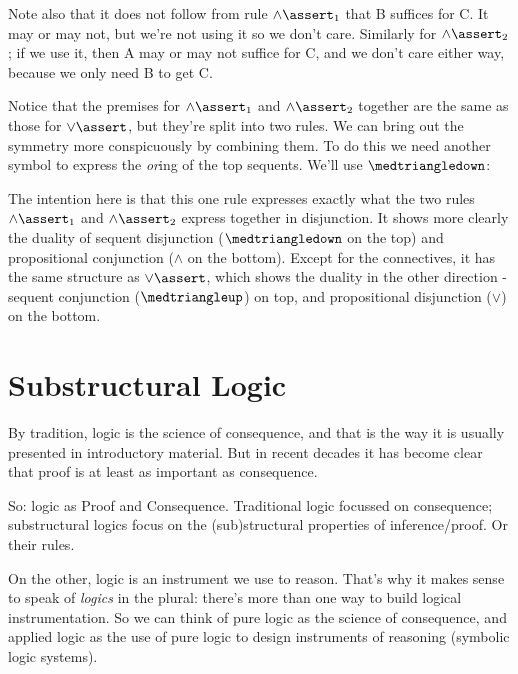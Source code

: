 \documentclass{article}
\begin{document}
Note also that it does not follow from rule \(\land\linfer_1\) that B
suffices for C. It may or may not, but we're not using it so we don't
care. Similarly for \(\land\linfer_2\); if we use it, then A may or may
not suffice for C, and we don't care either way, because we only need
B to get C.

Notice that the premises for \(\land\linfer_1\) and \(\land\linfer_2\)
together are the same as those for \(\lor\linfer\), but they're split
into two rules. We can bring out the symmetry more conspicuously by
combining them. To do this we need another symbol to express the
\textit{or}ing of the top sequents. We'll use \(\medtriangledown\):


The intention here is that this one rule expresses exactly what the
two rules \(\land\linfer_1\) and \(\land\linfer_2\) express together in
disjunction. It shows more clearly the duality of sequent disjunction
(\(\medtriangledown\) on the top) and propositional conjunction
(\(\land\) on the bottom). Except for the connectives, it has the same
structure as \(\lor\linfer\), which shows the duality in the other
direction - sequent conjunction (\(\medtriangleup\)) on top, and
propositional disjunction (\(\lor\)) on the bottom.

\section{Substructural Logic}

By tradition, logic is the science of consequence, and that is the way
it is usually presented in introductory material. But in recent
decades it has become clear that proof is at least as important as
consequence.

So: logic as Proof and Consequence. Traditional logic focussed on
consequence; substructural logics focus on the (sub)structural
properties of inference/proof. Or their rules.

On the other, logic is an instrument we use to reason. That's why it
makes sense to speak of \textit{logics} in the plural: there's more
than one way to build logical instrumentation. So we can think of pure
logic as the science of consequence, and applied logic as the use of
pure logic to design instruments of reasoning (symbolic logic
systems).
\end{document}
